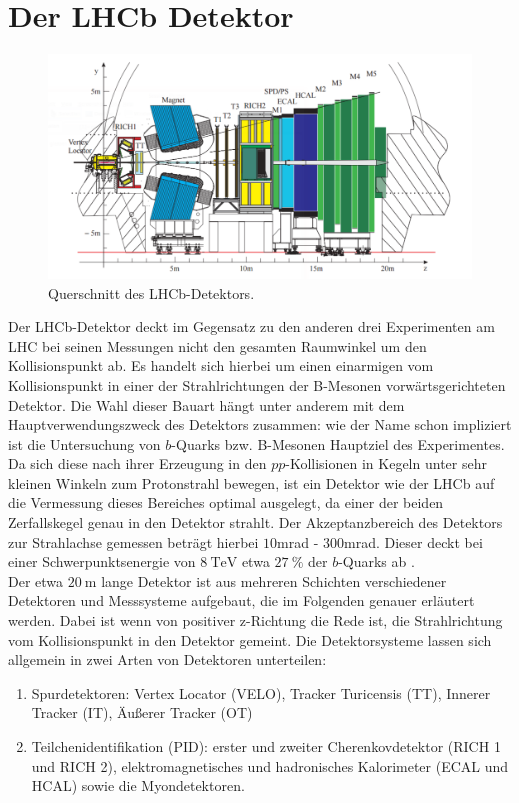 \section{Der LHCb Detektor}
%
\begin{figure}[H]
  \centering
      \includegraphics[width=\textwidth]{Plots/lhcb.pdf}
  \caption{Querschnitt des LHCb-Detektors\cite{lhcb}.}
  \label{fig:lhcb}
\end{figure}
%
Der LHCb-Detektor deckt im Gegensatz zu den anderen drei Experimenten am LHC bei seinen Messungen nicht den gesamten Raumwinkel um den Kollisionspunkt ab. Es handelt sich hierbei um einen einarmigen vom Kollisionspunkt in einer der Strahlrichtungen der B-Mesonen vorwärtsgerichteten Detektor. Die Wahl dieser Bauart hängt unter anderem mit dem Hauptverwendungszweck des Detektors zusammen: wie der Name schon impliziert ist die Untersuchung von $b$-Quarks bzw. B-Mesonen Hauptziel des Experimentes. Da sich diese nach ihrer Erzeugung in den $pp$-Kollisionen in Kegeln unter sehr kleinen Winkeln zum Protonstrahl bewegen, ist ein Detektor wie der LHCb auf die Vermessung dieses Bereiches optimal ausgelegt, da einer der beiden Zerfallskegel genau in den Detektor strahlt. Der Akzeptanzbereich des Detektors zur Strahlachse gemessen beträgt hierbei $10$mrad - $300$mrad. Dieser deckt bei einer Schwerpunktsenergie von $\SI{8}{\tera\electronvolt}$ etwa $\SI{27}{\percent}$ der $b$-Quarks ab \cite{rad}.\\
%
Der etwa $\SI{20}{\meter}$ lange Detektor ist aus mehreren Schichten verschiedener Detektoren und Messsysteme aufgebaut, die im Folgenden genauer erläutert werden. Dabei ist wenn von positiver z-Richtung die Rede ist, die Strahlrichtung vom Kollisionspunkt in den Detektor gemeint. Die Detektorsysteme lassen sich allgemein in zwei Arten von Detektoren unterteilen:
%
\begin{enumerate}
  \item Spurdetektoren: Vertex Locator (VELO), Tracker Turicensis (TT), Innerer Tracker (IT), Äußerer Tracker (OT)
  \item Teilchenidentifikation (PID): erster und zweiter Cherenkovdetektor (RICH 1 und RICH 2), elektromagnetisches und hadronisches Kalorimeter (ECAL und HCAL) sowie die Myondetektoren.
\end{enumerate}
